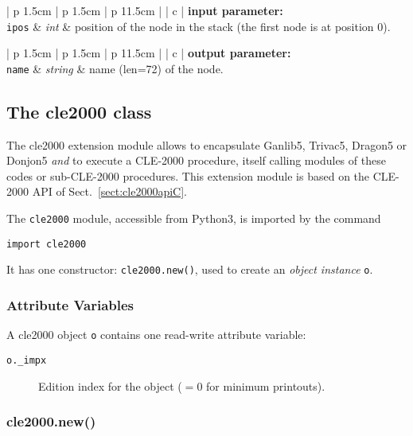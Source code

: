 \noindent
\begin{tabular} {| p {1.5cm} | p {1.5cm} | p {11.5cm} |}
\hline
{} {| c |} {\bf input parameter:} \\
\hline
{\tt ipos} & {\it int}  & position of the node in the stack (the first node is at position 0). \\
\hline
\end{tabular}

\vskip 0.8cm

\noindent
\begin{tabular} {| p {1.5cm} | p {1.5cm} | p {11.5cm} |}
\hline
{} {| c |} {\bf output parameter:} \\
\hline
{\tt name} & {\it string} & name (len=72) of the node.\\
\hline
\end{tabular}

\vskip 0.8cm

\subsection{The cle2000 class}

The  {\sc cle2000} extension module allows to encapsulate Ganlib5, Trivac5, Dragon5 or Donjon5 {\sl and} to execute a CLE-2000 procedure, itself calling modules of these codes or sub-CLE-2000 procedures. This extension module is based on the CLE-2000 API of Sect.~\ref{sect:cle2000apiC}. 

The {\tt cle2000} module, accessible from Python3, is imported by the command
\begin{verbatim}
import cle2000
\end{verbatim}
It has one constructor: {\tt cle2000.new()}, used to create an {\sl object instance} {\tt o}.

\subsubsection{Attribute Variables}

A {\sc cle2000} object {\tt o} contains one read-write attribute variable:

\begin {description}
\item [{\tt o.\_impx}] Edition index for the object ($=0$ for minimum printouts).
\end {description}

\subsubsection{cle2000.new()}

